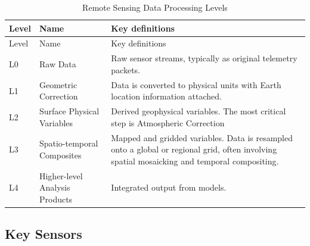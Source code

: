 \documentclass[
  letterpaper,
  DIV=11,
  numbers=noendperiod]{scrreprt}
\begin{document}
\begin{longtable}[]{@{}
  >{\raggedright\arraybackslash}p{}
  >{\raggedright\arraybackslash}p{}
  >{\raggedright\arraybackslash}p{}@{}}
\caption{Remote Sensing Data Processing Levels}\tabularnewline
\toprule\noalign{}
\begin{minipage}[b]{\linewidth}\raggedright
Level
\end{minipage} & \begin{minipage}[b]{\linewidth}\raggedright
Name
\end{minipage} & \begin{minipage}[b]{\linewidth}\raggedright
Key definitions
\end{minipage} \\
\midrule\noalign{}
\endfirsthead
\toprule\noalign{}
\begin{minipage}[b]{\linewidth}\raggedright
Level
\end{minipage} & \begin{minipage}[b]{\linewidth}\raggedright
Name
\end{minipage} & \begin{minipage}[b]{\linewidth}\raggedright
Key definitions
\end{minipage} \\
\midrule\noalign{}
\endhead
\bottomrule\noalign{}
\endlastfoot
L0 & Raw Data & Raw sensor streams, typically as original telemetry
packets. \\
L1 & Geometric Correction & Data is converted to physical units with
Earth location information attached. \\
L2 & Surface Physical Variables & Derived geophysical variables. The
most critical step is Atmospheric Correction \\
L3 & Spatio-temporal Composites & Mapped and gridded variables. Data is
resampled onto a global or regional grid, often involving spatial
mosaicking and temporal compositing. \\
L4 & Higher-level Analysis Products & Integrated output from models. \\
\end{longtable}

\subsection{Key Sensors}\label{key-sensors}
\end{document}
